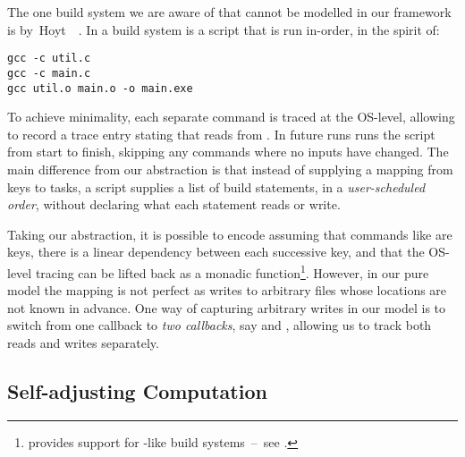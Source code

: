 The one build system we are aware of that cannot be modelled in our framework is
\Fabricate by~Hoyt~\etal~. In \Fabricate a build system is
a script that is run in-order, in the spirit of:

\vspace{1mm}
\begin{verbatim}
gcc -c util.c
gcc -c main.c
gcc util.o main.o -o main.exe
\end{verbatim}
\vspace{1mm}

To achieve minimality, each separate command is traced at the OS-level, allowing
\Fabricate to record a trace entry stating that  reads from
. In future runs \Fabricate runs the script from start to finish,
skipping any commands where no inputs have changed. The main difference from our
 abstraction is that instead of supplying a mapping from keys to
tasks, a \Fabricate script supplies a list of build statements, in a
\emph{user-scheduled order}, without declaring what each statement reads or write.

Taking our abstraction, it is possible to encode \Fabricate assuming that
commands like  are keys, there is a linear dependency between
each successive key, and that the OS-level tracing can be lifted back as a
monadic  function\footnote{\Shake provides support for
\Fabricate{}-like build systems~--~see .}.
However, in our pure model the mapping is not perfect as  writes to
arbitrary files whose locations are not known in advance. One way of capturing
arbitrary writes in our model is to switch from one callback  to
\emph{two callbacks}, say  and , allowing us to track both
reads and writes separately.

\subsection{Self-adjusting Computation}

